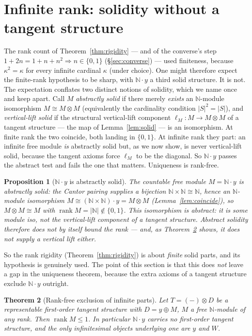 \documentclass[11pt]{article}
\newtheorem{theorem}{Theorem}
\newtheorem{proposition}[theorem]{Proposition}
\theoremstyle{definition}
\newcommand{\N}{\mathbb{N}}
\newcommand{\rank}{\operatorname{rank}}
\begin{document}
\section{Infinite rank: solidity without a tangent structure}\label{sec:sharp}

The rank count of Theorem~\ref{thm:rigidity} --- and of the converse's step $1+2n=1+n+n^2\Rightarrow
n\in\{0,1\}$ (\S\ref{sec:converse}) --- used finiteness, because $\kappa^2=\kappa$ for every infinite
cardinal $\kappa$ (under choice). One might therefore expect the finite-rank hypothesis to be sharp,
with $\N\cdot y$ a third solid structure. It is not. The expectation conflates two distinct notions of
solidity, which we name once and keep apart. Call $M$ \emph{abstractly solid} if there merely
\emph{exists} an $\N$-module isomorphism $M\cong M\otimes M$ (equivalently the cardinality condition
$|S|^2=|S|$), and \emph{vertical-lift solid} if the structural vertical-lift component
$\ell_M\colon M\to M\otimes M$ of a tangent structure --- the map of Lemma~\ref{lem:solid} --- is an
isomorphism. At finite rank the two coincide, both landing in $\{0,1\}$. At infinite rank they part:
an infinite free module \emph{is} abstractly solid but, as we now show, is never vertical-lift solid,
because the tangent axioms force $\ell_M$ to be the diagonal. So $\N\cdot y$ passes the abstract test
and fails the one that matters. Uniqueness is rank-free.

\begin{proposition}[$\N\cdot y$ is abstractly solid]\label{prop:infinite}
The countable free module $M=\N\cdot y$ is \emph{abstractly} solid: the Cantor pairing supplies a
bijection $\N\times\N\cong\N$, hence an $\N$-module isomorphism $M\cong(\N\times\N)\cdot y=M\otimes M$
(Lemma~\ref{lem:coincide}), so $M\otimes M\cong M$ with $\rank M=|\N|\notin\{0,1\}$. This isomorphism
is \emph{abstract}: it is some module iso, not the vertical-lift component of a tangent structure.
Abstract solidity therefore does not by itself bound the rank --- and, as Theorem~\ref{thm:rankfree}
shows, it does not supply a vertical lift either.
\end{proposition}

So the rank rigidity (Theorem~\ref{thm:rigidity}) is about \emph{finite} solid parts, and its
hypothesis is genuinely used. The point of this section is that this does \emph{not} leave a gap in
the uniqueness theorem, because the extra axioms of a tangent structure exclude $\N\cdot y$ outright.

\begin{theorem}[Rank-free exclusion of infinite parts]\label{thm:rankfree}
Let $T=(-)\otimes D$ be a representable first-order tangent structure with $D=y\oplus M$, $M$ a free
$\N$-module of \emph{any} rank. Then $\rank M\le1$. In particular $\N\cdot y$ carries no first-order
tangent structure, and the only infinitesimal objects underlying one are $y$ and $W$.
\end{theorem}
\end{document}
